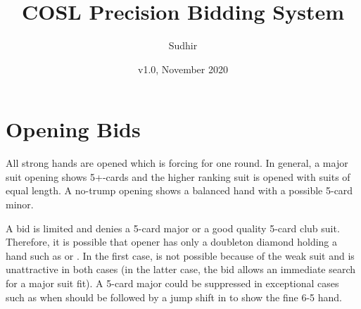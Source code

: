 \documentclass[10pt]{article}%
\begin{document}
\title{COSL Precision Bidding System}
\author{Sudhir}
\date{v1.0, November 2020}
\maketitle

\tableofcontents

\section{Opening Bids}
All strong hands are opened  which is forcing for one round. In
general, a major suit opening shows 5+-cards and the higher ranking
suit is opened with suits of equal length. A no-trump opening shows a
balanced hand with a possible 5-card minor.

A  bid is limited and denies a 5-card major or a good quality
5-card club suit. Therefore, it is possible that opener has only a
doubleton diamond holding a hand such as  or
. In the first case,  is not possible
because of the weak suit and  is unattractive in both cases (in
the latter case, the  bid allows an immediate search for a major
suit fit). A 5-card major could be suppressed in exceptional cases
such as  when  should be followed by a
jump shift in \sp{} to show the fine 6-5 hand.
\end{document}
